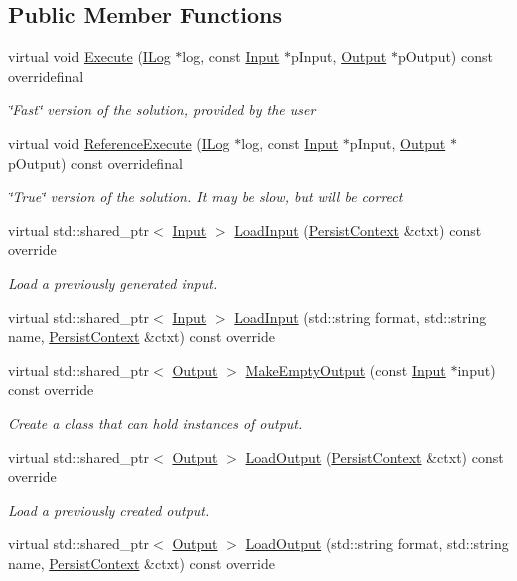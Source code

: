 \subsection*{Public Member Functions}
\begin{DoxyCompactItemize}
\item 
virtual void \hyperlink{a00027_a47abc3006071967c9bfcd8f844667534}{Execute} (\hyperlink{a00008}{I\+Log} $\ast$log, const \hyperlink{a00009}{Input} $\ast$p\+Input, \hyperlink{a00023}{Output} $\ast$p\+Output) const overridefinal
\begin{DoxyCompactList}\small\item\em \char`\"{}\+Fast\char`\"{} version of the solution, provided by the user \end{DoxyCompactList}\item 
virtual void \hyperlink{a00027_a28e795c9a05b405e4b6edd631134e54b}{Reference\+Execute} (\hyperlink{a00008}{I\+Log} $\ast$log, const \hyperlink{a00009}{Input} $\ast$p\+Input, \hyperlink{a00023}{Output} $\ast$p\+Output) const overridefinal
\begin{DoxyCompactList}\small\item\em \char`\"{}\+True\char`\"{} version of the solution. It may be slow, but will be correct \end{DoxyCompactList}\item 
virtual std\+::shared\+\_\+ptr$<$ \hyperlink{a00009}{Input} $>$ \hyperlink{a00027_acaae615ba4ea5d3bbddfc9b2330ea81b}{Load\+Input} (\hyperlink{a00025}{Persist\+Context} \&ctxt) const override
\begin{DoxyCompactList}\small\item\em Load a previously generated input. \end{DoxyCompactList}\item 
virtual std\+::shared\+\_\+ptr$<$ \hyperlink{a00009}{Input} $>$ \hyperlink{a00027_a865bb4b2d8c2fce2c515946801d51513}{Load\+Input} (std\+::string format, std\+::string name, \hyperlink{a00025}{Persist\+Context} \&ctxt) const override
\item 
virtual std\+::shared\+\_\+ptr$<$ \hyperlink{a00023}{Output} $>$ \hyperlink{a00027_a9bf8f206dc0b60425a8d13f814fad9af}{Make\+Empty\+Output} (const \hyperlink{a00009}{Input} $\ast$input) const override
\begin{DoxyCompactList}\small\item\em Create a class that can hold instances of output. \end{DoxyCompactList}\item 
virtual std\+::shared\+\_\+ptr$<$ \hyperlink{a00023}{Output} $>$ \hyperlink{a00027_a2fadbddb381c6c6d048ea86f0ddc3038}{Load\+Output} (\hyperlink{a00025}{Persist\+Context} \&ctxt) const override
\begin{DoxyCompactList}\small\item\em Load a previously created output. \end{DoxyCompactList}\item 
virtual std\+::shared\+\_\+ptr$<$ \hyperlink{a00023}{Output} $>$ \hyperlink{a00027_a2209bbbda304dd748236d3b997116ca7}{Load\+Output} (std\+::string format, std\+::string name, \hyperlink{a00025}{Persist\+Context} \&ctxt) const override
\end{DoxyCompactItemize}
